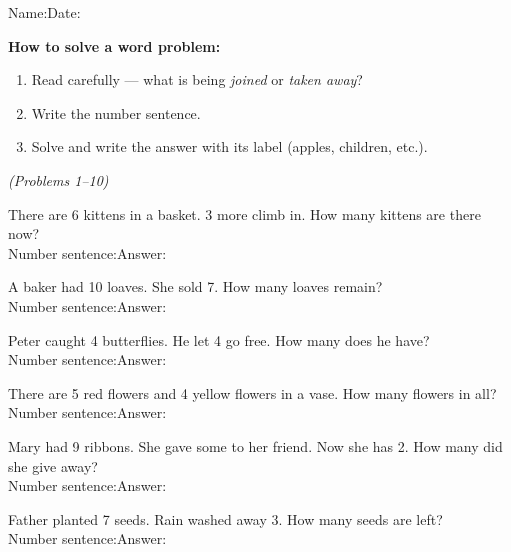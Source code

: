 \documentclass[12pt, letterpaper]{article}
\begin{document}

{\small Name:\ansblanklg \hfill Date:\ansblank}
\goldrule

\begin{instructbox}
\textbf{How to solve a word problem:}
\begin{enumerate}[leftmargin=2em,itemsep=2pt]
  \item Read carefully — what is being \emph{joined} or \emph{taken away}?
  \item Write the number sentence.
  \item Solve and write the answer with its label (apples, children, etc.).
\end{enumerate}
\end{instructbox}

\bigskip
{} \hfill \textit{(Problems 1–10)}

\bigskip
\prob There are 6 kittens in a basket. 3 more climb in. How many kittens are there now?\\[6pt]
\hspace{2em}Number sentence:\ansblanklg \quad Answer:\ansblank

\medskip
\prob A baker had 10 loaves. She sold 7. How many loaves remain?\\[6pt]
\hspace{2em}Number sentence:\ansblanklg \quad Answer:\ansblank

\medskip
\prob Peter caught 4 butterflies. He let 4 go free. How many does he have?\\[6pt]
\hspace{2em}Number sentence:\ansblanklg \quad Answer:\ansblank

\medskip
\prob There are 5 red flowers and 4 yellow flowers in a vase. How many flowers in all?\\[6pt]
\hspace{2em}Number sentence:\ansblanklg \quad Answer:\ansblank

\medskip
\prob Mary had 9 ribbons. She gave some to her friend. Now she has 2. How many did she give away?\\[6pt]
\hspace{2em}Number sentence:\ansblanklg \quad Answer:\ansblank

\medskip
\prob Father planted 7 seeds. Rain washed away 3. How many seeds are left?\\[6pt]
\hspace{2em}Number sentence:\ansblanklg \quad Answer:\ansblank
\end{document}
